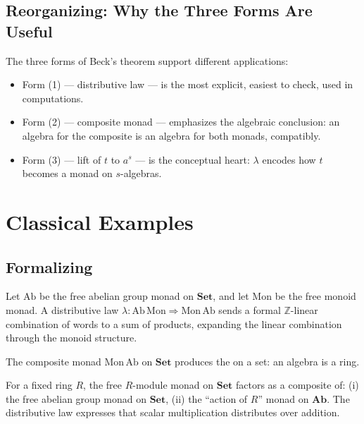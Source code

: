 \subsection{Reorganizing: Why the Three Forms Are Useful}

\begin{remark}
The three forms of Beck's theorem support different applications:
\begin{itemize}
  \item Form (1) — distributive law — is the most explicit, easiest to
        check, used in computations.
  \item Form (2) — composite monad — emphasizes the algebraic conclusion:
        an algebra for the composite is an algebra for both monads,
        compatibly.
  \item Form (3) — lift of $t$ to $a^s$ — is the conceptual heart: $\lambda$
        encodes how $t$ becomes a monad on $s$-algebras.
\end{itemize}
\end{remark}


\section{Classical Examples}
\label{sec:dist-examples}

\subsection{Formalizing}

\begin{example_thm}[Rings = (Abelian groups) $\otimes$ (Monoids)]
\label{ex:ring-dist}
Let $\mathrm{Ab}$ be the free abelian group monad on $\mathbf{Set}$, and
let $\mathrm{Mon}$ be the free monoid monad. A distributive law
$\lambda : \mathrm{Ab}\,\mathrm{Mon} \Rightarrow \mathrm{Mon}\,\mathrm{Ab}$
sends a formal $\mathbb{Z}$-linear combination of words to a sum of products,
expanding the linear combination through the monoid structure.

The composite monad $\mathrm{Mon}\,\mathrm{Ab}$ on $\mathbf{Set}$ produces
the  on a set: an algebra is a ring.
\end{example_thm}

\begin{example_thm}[Modules = (Abelian groups) $\otimes$ (Action of a monoid)]
For a fixed ring $R$, the free $R$-module monad on $\mathbf{Set}$ factors as
a composite of: (i) the free abelian group monad on $\mathbf{Set}$, (ii) the
``action of $R$'' monad on $\mathbf{Ab}$. The distributive law expresses
that scalar multiplication distributes over addition.
\end{example_thm}

